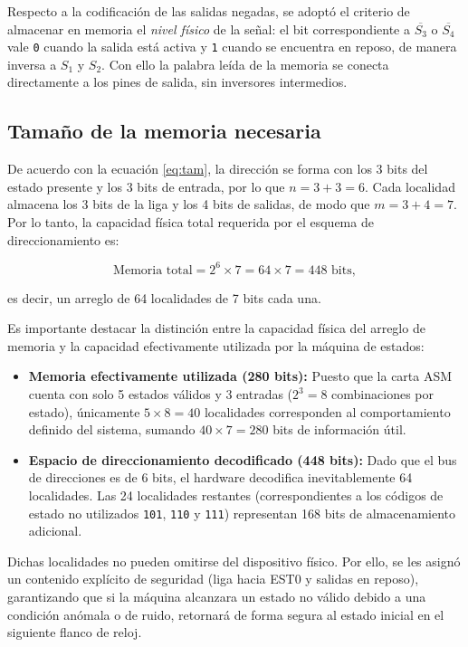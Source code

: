 Respecto a la codificación de las salidas negadas, se adoptó el criterio de almacenar
en memoria el \emph{nivel físico} de la señal: el bit correspondiente a $\overline{S_3}$
o $\overline{S_4}$ vale \texttt{0} cuando la salida está activa y \texttt{1} cuando se
encuentra en reposo, de manera inversa a $S_1$ y $S_2$. Con ello la palabra leída de la
memoria se conecta directamente a los pines de salida, sin inversores intermedios.

\subsection{Tamaño de la memoria necesaria}

De acuerdo con la ecuación \ref{eq:tam}, la dirección se forma con los 3 bits del estado
presente y los 3 bits de entrada, por lo que $n = 3 + 3 = 6$. Cada localidad almacena
los 3 bits de la liga y los 4 bits de salidas, de modo que $m = 3 + 4 = 7$. Por lo tanto,
la capacidad física total requerida por el esquema de direccionamiento es:

\[
\text{Memoria total} = 2^{6} \times 7 = 64 \times 7 = 448 \text{ bits},
\]

es decir, un arreglo de 64 localidades de 7 bits cada una.

Es importante destacar la distinción entre la capacidad física del arreglo de memoria y la
capacidad efectivamente utilizada por la máquina de estados:

\begin{itemize}
    \item \textbf{Memoria efectivamente utilizada (280 bits):} Puesto que la carta ASM
    cuenta con solo 5 estados válidos y 3 entradas ($2^3 = 8$ combinaciones por estado),
    únicamente $5 \times 8 = 40$ localidades corresponden al comportamiento definido del
    sistema, sumando $40 \times 7 = 280$ bits de información útil.
    \item \textbf{Espacio de direccionamiento decodificado (448 bits):} Dado que el bus de
    direcciones es de 6 bits, el hardware decodifica inevitablemente 64 localidades. Las 24
    localidades restantes (correspondientes a los códigos de estado no utilizados \texttt{101},
    \texttt{110} y \texttt{111}) representan 168 bits de almacenamiento adicional.
\end{itemize}

Dichas localidades no pueden omitirse del dispositivo físico. Por ello, se les asignó un
contenido explícito de seguridad (liga hacia EST0 y salidas en reposo), garantizando que si la
máquina alcanzara un estado no válido debido a una condición anómala o de ruido, retornará de
forma segura al estado inicial en el siguiente flanco de reloj.

